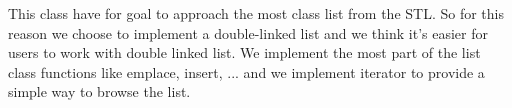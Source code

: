 This class have for goal to approach the most class list from the S\+T\+L. So for this reason we choose to implement a double-\/linked list and we think it's easier for users to work with double linked list. We implement the most part of the list class functions like emplace, insert, ... and we implement iterator to provide a simple way to browse the list. 